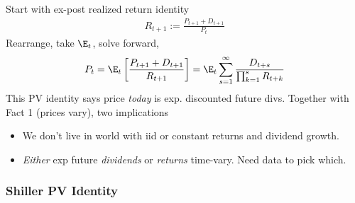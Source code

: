 \documentclass[12pt]{article}
\theoremstyle{plain}
\theoremstyle{definition}
\theoremstyle{remark}
\begin{document}
\begin{multicols*}{2}
Start with ex-post realized return identity
\begin{align}
  R_{t+1}
  :=
  \frac{P_{t+1}+D_{t+1}}{P_t}
  \label{expostrealizedreturns}
\end{align}
Rearrange, take $\E_t$, solve forward,
\begin{align*}
  P_{t}
  = \E_t\left[\frac{P_{t+1}+D_{t+1}}{R_{t+1}}\right]
  =
  \E_t\sum_{s=1}^\infty
  \frac{D_{t+s}}{\prod_{k=1}^s R_{t+k}}
\end{align*}
This PV identity says price \emph{today} is exp. discounted future divs.
Together with Fact 1 (prices vary), two implications
\begin{itemize}
  \item We don't live in world with iid or constant returns and dividend
    growth.
  \item
    \emph{Either} exp future \emph{dividends} or \emph{returns}
    time-vary. Need data to pick which.
\end{itemize}




\subsubsection{Shiller PV Identity}


\end{multicols*}
\end{document}
